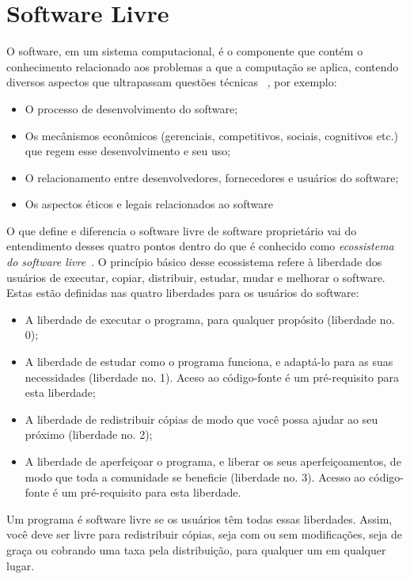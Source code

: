 \chapter{Software Livre}
\label{cap-software-livre}

%
O software, em um sistema computacional, é o componente que contém o conhecimento relacionado aos problemas a que a computação se aplica, contendo diversos aspectos que ultrapassam questões técnicas~\cite{meirelles2013}
, por exemplo:
\begin{itemize}
\item O processo de desenvolvimento do software;
\item Os mecânismos econômicos (gerenciais, competitivos, sociais, cognitivos etc.) que regem esse desenvolvimento e seu uso;
\item O relacionamento entre desenvolvedores, fornecedores e usuários do software;
\item Os aspectos éticos e legais relacionados ao software
\end{itemize} 

O que define e diferencia o software livre de software proprietário vai do entendimento desses quatro pontos dentro do que é conhecido como \textit{ecossistema do software livre}~\cite{meirelles2013}.
O princípio básico desse ecossistema refere à liberdade dos usuários de executar, copiar, distribuir, estudar, mudar e melhorar o software. Estas estão definidas nas quatro liberdades para os usuários do software:

\begin{itemize}
\item A liberdade de executar o programa, para qualquer propósito (liberdade no. 0);
\item A liberdade de estudar como o programa funciona, e adaptá-lo para as suas necessidades (liberdade no. 1). Aceso ao código-fonte é um pré-requisito para esta liberdade;
\item A liberdade de redistribuir cópias de modo que você possa ajudar ao seu próximo (liberdade no. 2);
\item A liberdade de aperfeiçoar o programa, e liberar os seus aperfeiçoamentos, de modo que toda a comunidade se beneficie (liberdade no. 3). Acesso ao código-fonte é um pré-requisito para esta liberdade.
\end{itemize}

Um programa é software livre se os usuários têm todas essas liberdades. Assim, você deve ser livre para redistribuir cópias, seja com ou sem modificações, seja de graça ou cobrando uma taxa pela distribuição, para qualquer um em qualquer lugar.


